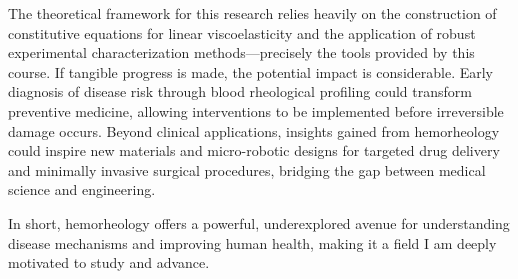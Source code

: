 \medskip
The theoretical framework for this research relies heavily on the construction of constitutive equations for linear viscoelasticity and the application of robust experimental characterization methods—precisely the tools provided by this course. If tangible progress is made, the potential impact is considerable. Early diagnosis of disease risk through blood rheological profiling could transform preventive medicine, allowing interventions to be implemented before irreversible damage occurs. Beyond clinical applications, insights gained from hemorheology could inspire new materials and micro-robotic designs for targeted drug delivery and minimally invasive surgical procedures, bridging the gap between medical science and engineering.

\medskip
In short, hemorheology offers a powerful, underexplored avenue for understanding disease mechanisms and improving human health, making it a field I am deeply motivated to study and advance.

